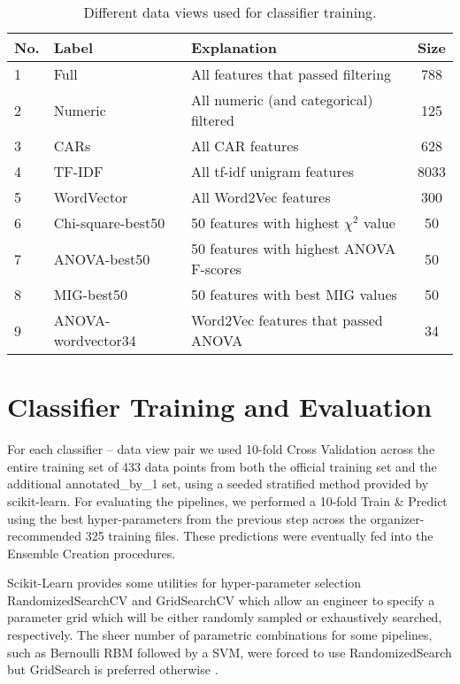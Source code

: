 \begin{table}[]
    \centering
    \begin{tabular}{|l|l|l|c|}
    \hline
    \textsf{No.} & \textsf{Label} & \textsf{Explanation} & \textsf{Size}\\
    \hline
        1 & \textsf{Full} & All features that passed filtering & 788 \\ 
        2 & \textsf{Numeric} & All numeric (and categorical) filtered & 125\\ 
        3 & \textsf{CARs} & All CAR features & 628 \\
        4 & \textsf{TF-IDF} & All tf-idf unigram features & 8033\\
        5 & \textsf{WordVector}& All \textsf{Word2Vec} features & 300\\
        6 & \textsf{Chi-square-best50}& 50 features with highest $\chi^2$ value & 50\\
        7 & \textsf{ANOVA-best50} & 50 features with highest ANOVA F-scores & 50 \\
        8 & \textsf{MIG-best50} & 50 features with best MIG values & 50 \\
        9 & \textsf{ANOVA-wordvector34}& \textsf{Word2Vec} features that passed ANOVA& 34\\
    \hline
    \end{tabular}
    \caption{Different data views used for classifier training.}
    \label{tab:dataviews}
\end{table}

\section{Classifier Training and Evaluation}

For each classifier -- data view pair
we used 10-fold Cross Validation across the entire training set of 433 data points
from both the official training set and the additional \textsf{annotated\_by\_1}
set, using a seeded stratified method provided by \textsf{scikit-learn}. For evaluating the pipelines, we performed a 10-fold Train \& Predict using the best hyper-parameters from the previous step across the organizer-recommended 325 training files. These predictions were eventually fed into the Ensemble Creation procedures. 

Scikit-Learn provides some utilities for hyper-parameter selection \textsf{RandomizedSearchCV} and \textsf{GridSearchCV} which allow an engineer to specify a parameter grid which will be either randomly sampled or exhaustively searched, respectively. The sheer number of parametric combinations for some pipelines, such as Bernoulli RBM followed by a SVM, were forced to use RandomizedSearch but GridSearch is preferred otherwise \cite{scikit-learn}.

